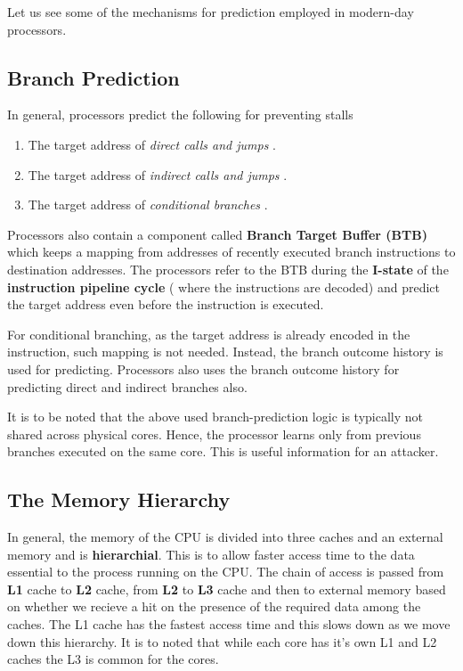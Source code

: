 \documentclass[12pt]{article}
\begin{document}
Let us see some of the mechanisms for prediction employed in modern-day processors.  

\subsection{Branch Prediction}
In general, processors predict the following for preventing stalls 
\begin{enumerate}
	\item The target address of \textit{ direct calls and jumps }.  
	\item The target address of \textit{ indirect calls and jumps }.
	\item The target address of \textit{ conditional branches }.
\end{enumerate}
Processors also contain a component called \textbf{Branch Target Buffer (BTB) } which keeps a mapping from addresses of recently executed branch instructions to destination addresses. The processors refer to the BTB during the \textbf{I-state} of the \textbf{instruction pipeline cycle} ( where the instructions are decoded) and predict the target address even before the instruction is executed.

For conditional branching, as the target address is already encoded in the instruction, such mapping is not needed. Instead, the branch outcome history is used for predicting. Processors also uses the branch outcome history for predicting direct and indirect branches also. 

It is to be noted that the above used branch-prediction logic is typically not shared across physical cores. Hence, the processor learns only from previous branches executed on the same core. This is useful information for an attacker.
\newpage
\subsection{The Memory Hierarchy}
In general, the memory of the CPU is divided into three caches and an external memory and is \textbf{hierarchial}. This is to allow faster access time to the data essential to the process running on the CPU. The chain of access is passed from \textbf{L1} cache to \textbf{L2} cache, from \textbf{L2} to \textbf{L3} cache and then to external memory based on whether we recieve a hit on the presence of the required data among the caches. The L1 cache has the fastest  access time and this slows down as we move down this hierarchy. It is to noted that while each core has it's own L1 and L2 caches the L3 is common for the cores.
\end{document}
